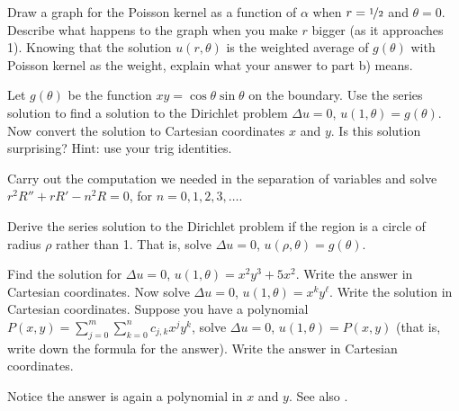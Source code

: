 \begin{exercise}
\pagebreak[2]
\leavevmode
\begin{tasks}
\task Draw a graph for the Poisson kernel as a function of $\alpha$
when $r=\nicefrac{1}{2}$ and $\theta = 0$.
\task Describe what happens to the graph when you make $r$ bigger (as it
approaches 1).
\task Knowing that the solution $u(r,\theta)$ is the weighted average
of $g(\theta)$ with Poisson kernel as the weight, explain what your answer
to part b) means.
\end{tasks}
\end{exercise}

\begin{exercise} \label{exercise:dirichproblemxy}
Let $g(\theta)$ be the function $xy = \cos \theta \sin
\theta$ on the boundary.  Use the series solution to find a solution
to the Dirichlet problem $\Delta u = 0$, $u(1,\theta) = g(\theta)$.  Now
convert the solution to Cartesian coordinates $x$ and $y$.  Is this
solution surprising?  Hint: use your trig identities.
\end{exercise}

\begin{exercise}
Carry out the computation we needed in the separation of variables and solve
$r^2 R'' + r R' - n^2 R = 0$, for $n=0,1,2,3,\ldots$.
\end{exercise}

\begin{exercise}[challenging]
Derive the series solution to the Dirichlet problem if the region is a
circle of radius $\rho$ rather
than 1.
That is, solve $\Delta u = 0$, $u(\rho,\theta) = g(\theta)$.
\end{exercise}

\begin{exercise}[challenging]
\leavevmode
\begin{tasks}
\task
Find the solution for
$\Delta u = 0$, $u(1,\theta) = x^2y^3 + 5 x^2$.  Write the answer in Cartesian coordinates.
\task
Now solve
$\Delta u = 0$, $u(1,\theta) = x^k y^\ell$.
Write the solution in Cartesian coordinates.
\task
Suppose you have a polynomial $P(x,y) = \sum_{j=0}^m \sum_{k=0}^n c_{j,k}
x^j y^k$, solve $\Delta u = 0$, $u(1,\theta) = P(x,y)$ (that is, write down
the formula for the answer).  Write the answer
in Cartesian coordinates.
\end{tasks}
Notice the answer is again a polynomial in $x$ and $y$.
See also .
\end{exercise}

